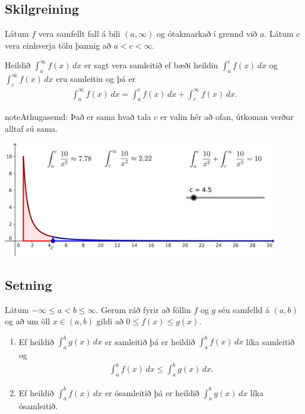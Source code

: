 \documentclass[b5paper,11pt,icelandic]{sphinxmanual}
\begin{document}
\subsection{Skilgreining}
\label{kafli06:id10}
Látum \(f\) vera samfellt fall á bili \((a,\infty)\) og
ótakmarkað í grennd við \(a\). Látum \(c\) vera einhverja tölu
þannig að \(a<c<\infty\).

Heildið \(\int_a^\infty f(x)\,dx\) er sagt vera samleitið ef bæði
heildin \(\int_a^c f(x)\,dx\) og \(\int_c^\infty f(x)\,dx\) eru
samleitin og þá er
\begin{equation*}
\begin{split}\int_{a}^\infty f(x)\,dx=\int_{a}^c f(x)\,dx + \int_c^\infty f(x)\,dx.\end{split}
\end{equation*}
\begin{notice}{note}{Athugasemd:}
Það er sama hvað tala \(c\) er valin hér að ofan, útkoman verður
alltaf sú sama.
\end{notice}


\begin{center}
\includegraphics[width=12cm,keepaspectratio=true]{07_samleitidheildi.png}
\end{center}



\subsection{Setning}
\label{kafli06:id11}
Látum \(-\infty\leq a<b\leq \infty\). Gerum ráð fyrir að föllin
\(f\) og \(g\) séu samfelld á \((a, b)\) og að um öll
\(x\in (a, b)\) gildi að \(0\leq f(x)\leq g(x)\).
\begin{enumerate}
\item {} 
Ef heildið \(\int_a^b g(x)\,dx\) er samleitið þá er heildið
\(\int_a^b f(x)\,dx\) líka samleitið og
\begin{equation*}
\begin{split}\int_a^b f(x)\,dx \leq \int_a^b g(x)\,dx.\end{split}
\end{equation*}
\item {} 
Ef heildið \(\int_a^b f(x)\,dx\) er ósamleitið þá er heildið
\(\int_a^b g(x)\,dx\) líka ósamleitið.

\end{enumerate}
\end{document}
